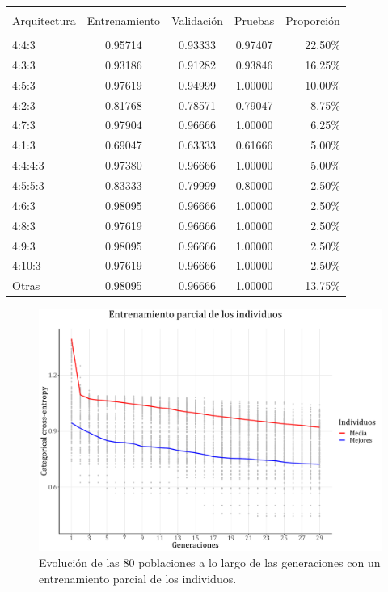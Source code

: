 \documentclass[spanish,a4paper,12pt,twoside]{report}
\begin{document}
  \begin{center}
     \label{table}
    \begin{tabular}{l c c c r}
      \hline \\ [-2ex]
      Arquitectura & Entrenamiento & Validación & Pruebas & Proporción \\ [0.5ex]
      \hline \\ [-1ex]
      4:4:3 & 0.95714 & 0.93333 & 0.97407 & 22.50\% \\
      4:3:3 & 0.93186 & 0.91282 & 0.93846 & 16.25\% \\ 
      4:5:3 & 0.97619 & 0.94999 & 1.00000 & 10.00\% \\
      4:2:3 & 0.81768 & 0.78571 & 0.79047 & 8.75\% \\
      4:7:3 & 0.97904 & 0.96666 & 1.00000 & 6.25\% \\ 
      4:1:3 & 0.69047 & 0.63333 & 0.61666 & 5.00\% \\
      4:4:4:3 & 0.97380 & 0.96666 & 1.00000 & 5.00\% \\
      4:5:5:3 & 0.83333 & 0.79999 & 0.80000 & 2.50\% \\
      4:6:3 & 0.98095 & 0.96666 & 1.00000 & 2.50\% \\
      4:8:3 & 0.97619 & 0.96666 & 1.00000 & 2.50\% \\ 
      4:9:3 & 0.98095 & 0.96666 & 1.00000 & 2.50\% \\
      4:10:3 & 0.97619 & 0.96666 & 1.00000 & 2.50\% \\ 
      Otras & 0.98095 & 0.96666 & 1.00000 & 13.75\% \\ [1ex]
      \hline
    \end{tabular}
  \end{center} \par
  \begin{figure}[H]
    \centering
    \includegraphics[width = 1\textwidth]{resources/Fig19.pdf}
    \caption{Evolución de las 80 poblaciones a lo largo de las generaciones con un entrenamiento parcial de los individuos.}
    \label{fig:19}
  \end{figure} \par
\end{document}
